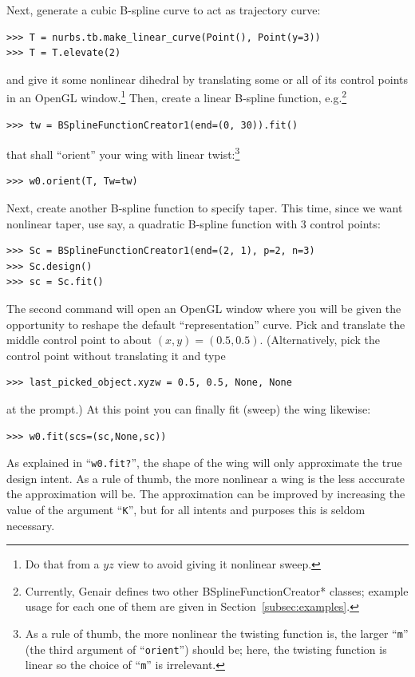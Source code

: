 \documentclass[]{article}
\begin{document}
Next, generate a cubic B-spline curve to act as trajectory curve:
\begin{verbatim}
>>> T = nurbs.tb.make_linear_curve(Point(), Point(y=3))
>>> T = T.elevate(2)
\end{verbatim}
and give it some nonlinear dihedral by translating some or all of its 
control points in an OpenGL window.\footnote{Do that from a $yz$ view to 
avoid giving it nonlinear sweep.}  Then, create a linear B-spline 
function, e.g.\footnote{Currently, Genair defines two other 
BSplineFunctionCreator* classes; example usage for each one of them are 
given in Section~\ref{subsec:examples}.}
\begin{verbatim}
>>> tw = BSplineFunctionCreator1(end=(0, 30)).fit()
\end{verbatim}
that shall ``orient'' your wing with linear twist:\footnote{As a rule of 
thumb, the more nonlinear the twisting function is, the larger 
``\texttt{m}'' (the third argument of ``\texttt{orient}'') should be; 
here, the twisting function is linear so the choice of ``\texttt{m}'' is 
irrelevant.}
\begin{verbatim}
>>> w0.orient(T, Tw=tw)
\end{verbatim}

Next, create another B-spline function to specify taper.  This time, 
since we want nonlinear taper, use say, a quadratic B-spline function 
with 3 control points:
\begin{verbatim}
>>> Sc = BSplineFunctionCreator1(end=(2, 1), p=2, n=3)
>>> Sc.design()
>>> sc = Sc.fit()
\end{verbatim}
The second command will open an OpenGL window where you will be given 
the opportunity to reshape the default ``representation'' curve.  Pick 
and translate the middle control point to about $(x, y) = (0.5, 0.5)$.  
(Alternatively, pick the control point without translating it and type
\begin{verbatim}
>>> last_picked_object.xyzw = 0.5, 0.5, None, None
\end{verbatim}
at the prompt.)  At this point you can finally fit (sweep) the wing 
likewise:
\begin{verbatim}
>>> w0.fit(scs=(sc,None,sc))
\end{verbatim}
As explained in ``\texttt{w0.fit?}'', the shape of the wing will only 
approximate the true design intent.  As a rule of thumb, the more 
nonlinear a wing is the less acccurate the approximation will be.  The 
approximation can be improved by increasing the value of the argument 
``\texttt{K}'', but for all intents and purposes this is seldom 
necessary.
\end{document}
